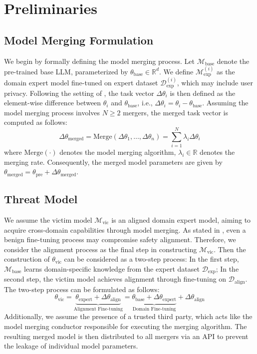 \section{Preliminaries}

\subsection{Model Merging Formulation}

We begin by formally defining the model merging process. Let $\mathcal{M}_\text{base}$ denote the pre-trained base LLM, parameterized by $\theta_\text{base} \in \mathbb{R}^d$. We define $\mathcal{M}_\text{exp}^{(i)}$ as the domain expert model fine-tuned on expert dataset $\mathcal{D}_\text{exp}^{(i)}$, which may include user privacy. Following the setting of \citet{ilharcoediting}, the task vector $\Delta \theta_i$ is then defined as the element-wise difference between $\theta_i$ and $\theta_\text{base}$, i.e., $\Delta \theta_i=\theta_i-\theta_\text{base}$. Assuming the model merging process involves $N \ge 2$ mergers, the merged task vector is computed as follows:
$$
\Delta \theta_\text{merged}=\text{Merge}(\Delta \theta_1, \dots, \Delta \theta_n) = \sum_{i=1}^{N}\lambda_i\Delta \theta_i 
$$
where $\text{Merge}(\cdot)$ denotes the model merging algorithm, $\lambda_i \in \mathbb{R}$ denotes the merging rate. Consequently, the merged model parameters are given by $\theta_\text{merged}=\theta_\text{pre}+\Delta \theta_\text{merged}$.

\subsection{Threat Model}

We assume the victim model $\mathcal{M}_\text{vic}$ is an aligned domain expert model, aiming to acquire cross-domain capabilities through model merging. As stated in \citet{qi2024fine}, even a benign fine-tuning process may compromise safety alignment. Therefore, we consider the alignment process as the final step in constructing $\mathcal{M}_\text{vic}$. Then the construction of $\theta_\text{vic}$ can be considered as a two-step process: In the first step, $\mathcal{M}_\text{base}$ learns domain-specific knowledge from the expert dataset $\mathcal{D}_\text{exp}$; In the second step, the victim model achieves alignment through fine-tuning on $\mathcal{D}_\text{align}$. The two-step process can be formulated as follows:
$$
\theta_\text{vic}=\underbrace{\theta_\text{expert}+\Delta \theta_\text{align}}_\text{Alignment Fine-tuning}=\underbrace{\theta_\text{base}+\Delta \theta_\text{expert}}_\text{Domain Fine-tuning}+\Delta \theta_\text{align}
$$
Additionally, we assume the presence of a trusted third party, which acts like the model merging conductor responsible for executing the merging algorithm. The resulting merged model is then distributed to all mergers via an API to prevent the leakage of individual model parameters. 

